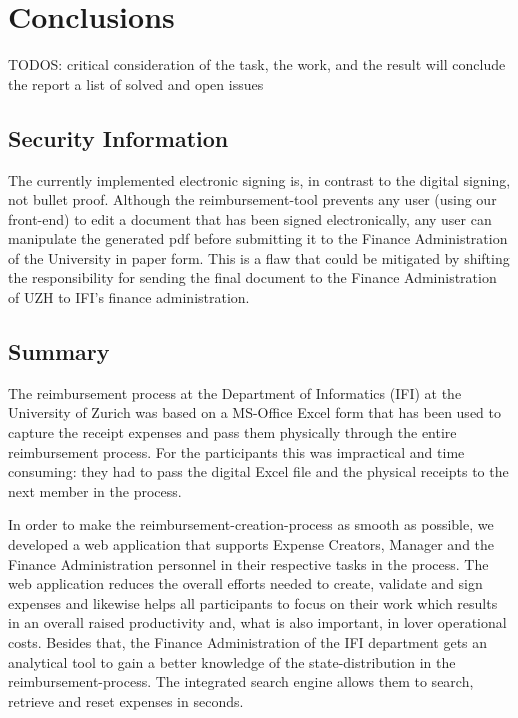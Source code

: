 \chapter{Conclusions}

TODOS:
 critical  consideration of the task, the work, and the result will conclude the report
 a list of solved and open issues
 
 
 \section{Security Information}
The currently implemented electronic signing is, in contrast to the digital signing, not bullet proof. Although the reimbursement-tool prevents any user (using our front-end) to edit a document that has been signed electronically, any user can manipulate the generated pdf before submitting it to the Finance Administration of the University in paper form. This is a flaw that could be mitigated by shifting the responsibility for sending the final document to the Finance Administration of UZH to IFI's finance administration.
 
 
\section{Summary}

The reimbursement process at the Department of Informatics (IFI) at the University of Zurich was based on a MS-Office Excel form that has been used to capture the receipt expenses and pass them physically through the entire reimbursement process. For the participants this was impractical and time consuming: they had to pass the digital Excel file and the physical receipts to the next member in the process.\par

In order to make the reimbursement-creation-process as smooth as possible, we developed a web application that supports Expense Creators, Manager and the Finance Administration personnel in their respective tasks in the process. The web application reduces the overall efforts needed to create, validate and sign expenses and likewise helps all participants to focus on their work which results in an overall raised productivity and, what is also important, in lover operational costs. Besides that, the Finance Administration of the IFI department gets an analytical tool to gain a better knowledge of the state-distribution in the reimbursement-process. The integrated search engine allows them to search, retrieve and reset expenses in seconds. \par

